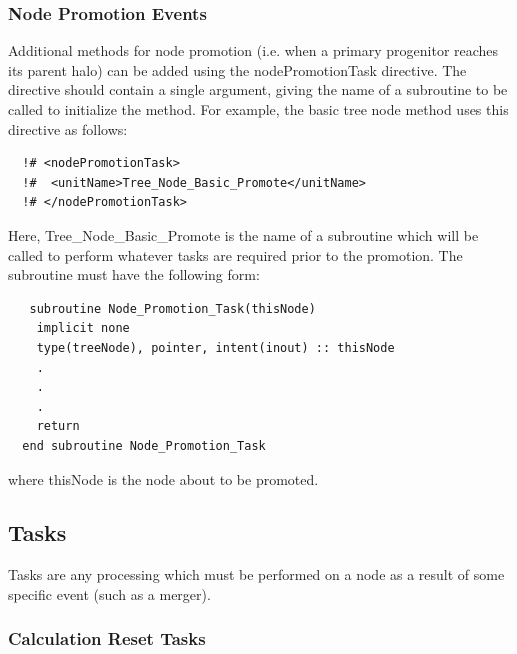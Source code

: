 \subsubsection{Node Promotion Events}

Additional methods for node promotion (i.e. when a primary progenitor reaches its parent halo) can be added using the {\normalfont \ttfamily nodePromotionTask} directive. The directive should contain a single argument, giving the name of a subroutine to be called to initialize the method. For example, the {\normalfont \ttfamily basic} tree node method uses this directive as follows:
\begin{verbatim}
  !# <nodePromotionTask>
  !#  <unitName>Tree_Node_Basic_Promote</unitName>
  !# </nodePromotionTask>
\end{verbatim}
Here, {\normalfont \ttfamily Tree\_Node\_Basic\_Promote} is the name of a subroutine which will be called to perform whatever tasks are required prior to the promotion. The subroutine must have the following form:
\begin{verbatim}
   subroutine Node_Promotion_Task(thisNode)
    implicit none
    type(treeNode), pointer, intent(inout) :: thisNode
    .
    .
    .
    return
  end subroutine Node_Promotion_Task
\end{verbatim}
where {\normalfont \ttfamily thisNode} is the node about to be promoted.

\subsection{Tasks}

Tasks are any processing which must be performed on a node as a result of some specific event (such as a merger).

\subsubsection{Calculation Reset Tasks}\label{sec:CalculationResetTask}

